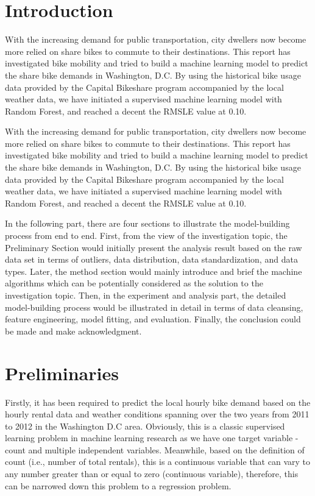 \section{Introduction}\label{sec-intro}
With the increasing demand for public transportation, city dwellers now become more relied on share bikes to commute to their destinations. This report has investigated bike mobility and tried to build a machine learning model to predict the share bike demands in Washington, D.C. By using the historical bike usage data provided by the Capital Bikeshare program accompanied by the local weather data, we have initiated a supervised machine learning model with Random Forest, and reached a decent the RMSLE value at 0.10.

With the increasing demand for public transportation, city dwellers now become more relied on share bikes to commute to their destinations. This report has investigated bike mobility and tried to build a machine learning model to predict the share bike demands in Washington, D.C. By using the historical bike usage data provided by the Capital Bikeshare program accompanied by the local weather data, we have initiated a supervised machine learning model with Random Forest, and reached a decent the RMSLE value at 0.10.

In the following part, there are four sections to illustrate the model-building process from end to end. First, from the view of the investigation topic, the Preliminary Section would initially present the analysis result based on the raw data set in terms of outliers, data distribution, data standardization, and data types. Later, the method section would mainly introduce and brief the machine algorithms which can be potentially considered as the solution to the investigation topic. Then, in the experiment and analysis part, the detailed model-building process would be illustrated in detail in terms of data cleansing, feature engineering, model fitting, and evaluation. Finally, the conclusion could be made and make acknowledgment.


\section{Preliminaries} \label{sec-preliminaries}

Firstly, it has been required to predict the local hourly bike demand based on the hourly rental data and weather conditions spanning over the two years from 2011 to 2012 in the Washington D.C area. Obviously, this is a classic supervised learning problem in machine learning research as we have one target variable - count and multiple independent variables. Meanwhile, based on the definition of count (i.e., number of total rentals), this is a continuous variable that can vary to any number greater than or equal to zero (continuous variable), therefore, this can be narrowed down this problem to a regression problem.

